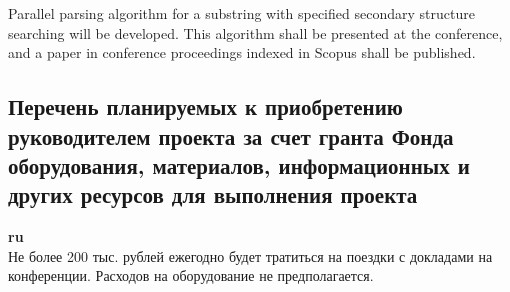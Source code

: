 \documentclass[12pt]{article}  %
\theoremstyle{remark}
\begin{document}
Parallel parsing algorithm for a substring with specified secondary structure searching will be developed.
This algorithm shall be presented at the conference, and a paper in conference proceedings indexed in Scopus shall be published.

\subsection{Перечень планируемых к приобретению руководителем проекта за счет гранта Фонда оборудования, материалов, информационных и других ресурсов для выполнения проекта}

\textbf{ru}\\
Не более 200 тыс. рублей ежегодно будет тратиться на поездки с докладами на конференции. Расходов на оборудование не предполагается.
\end{document}
